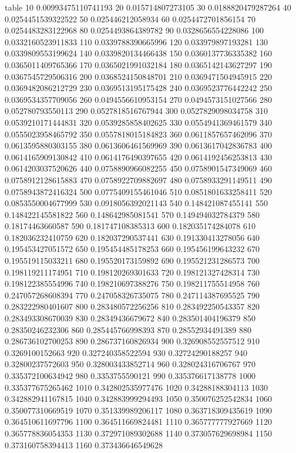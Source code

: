 table {%
10 0.00993475110741193
20 0.015714807273105
30 0.0188820479287264
40 0.0254451539322522
50 0.025446212058934
60 0.0254472701856154
70 0.0254483283122968
80 0.0254493864389782
90 0.0328656554228086
100 0.0332160523911833
110 0.0339788390665996
120 0.033979897193281
130 0.0339809553199624
140 0.0339820134466438
150 0.0360137736335382
160 0.0365011409765366
170 0.0365021991032184
180 0.0365142143627297
190 0.0367545729506316
200 0.0368524150848701
210 0.0369471504945915
220 0.0369482086212729
230 0.0369513195175428
240 0.0369523776442242
250 0.0369534357709056
260 0.0494556610953154
270 0.0494573151027566
280 0.052780793550113
290 0.0527818516767944
300 0.0527829098034758
310 0.0539210171444831
320 0.0539285858402625
330 0.0554941369461579
340 0.0555023958465792
350 0.0557818015184823
360 0.0611857657462096
370 0.0613595880303155
380 0.0613606461569969
390 0.0613617042836783
400 0.0614165909130842
410 0.0614176490397655
420 0.0614192456253813
430 0.0614203037520626
440 0.0758890966082255
450 0.0758901547349069
460 0.0758912128615883
470 0.0758922709882697
480 0.0758933291149511
490 0.0758943872416324
500 0.0775409155461046
510 0.0851801633258411
520 0.0853550004677999
530 0.0918056392021143
540 0.148421087455141
550 0.148422145581822
560 0.148642985081541
570 0.149494032784379
580 0.18174463660587
590 0.181747108385313
600 0.182035174284078
610 0.182036232410759
620 0.182037290537441
630 0.191330413278056
640 0.195453427051572
650 0.195454485178253
660 0.195456199643232
670 0.195519115033211
680 0.195520173159892
690 0.195521231286573
700 0.198119211174951
710 0.198120269301633
720 0.198121327428314
730 0.198122385554996
740 0.198210697388276
750 0.198211755514958
760 0.247057268608394
770 0.247058326735075
780 0.247114387695525
790 0.283222980401607
800 0.283480572256256
810 0.283492250543357
820 0.283493308670039
830 0.28349436679672
840 0.283501404196379
850 0.28350246232306
860 0.285445766998393
870 0.28552934491389
880 0.286736102700253
890 0.286737160826934
900 0.326908552557512
910 0.3269100152663
920 0.327240358522594
930 0.32724290188257
940 0.32800237572603
950 0.328003433852714
960 0.328024316706767
970 0.335372100634942
980 0.3353755590121
990 0.335376617138778
1000 0.335377675265462
1010 0.342802535977476
1020 0.34288188304113
1030 0.342882941167815
1040 0.342883999294493
1050 0.350076252542834
1060 0.350077310669519
1070 0.351339989206117
1080 0.363718309435619
1090 0.364510611697796
1100 0.364511669824481
1110 0.365777777927669
1120 0.365778836054353
1130 0.372971089302688
1140 0.373057629698984
1150 0.373160758394413
1160 0.373436646549628
}
